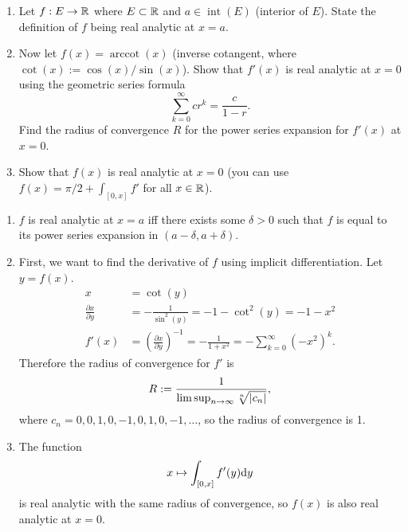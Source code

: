 \documentclass{article}
\begin{document}
\bigskip
\begin{prob}
    \begin{enumerate}[label=(\alph*)]
        \item Let $f: E \rightarrow \mathbb{R}$ where $E \subset \mathbb{R}$ and $a \in \operatorname{int}(E)$ (interior of $E$). State the definition of $f$ being real analytic at $x=a$.
        \item Now let $f(x) = \operatorname{arccot}(x)$ (inverse cotangent, where $\cot(x) := \cos(x)/\sin(x)$). Show that $f'(x)$ is real analytic at $x=0$ using the geometric series formula
            \[ \sum_{k=0}^\infty cr^k = \frac{c}{1-r}. \]
            Find the radius of convergence $R$ for the power series expansion for $f'(x)$ at $x=0$.
        \item Show that $f(x)$ is real analytic at $x=0$ (you can use $f(x) = \pi/2 + \int_{[0,x]} f'$ for all $x \in \mathbb{R}$).
    \end{enumerate}
\end{prob}
\begin{enumerate}[label=(\alph*)]
    \item $f$ is real analytic at $x=a$ iff there exists some $\delta > 0$ such that $f$ is equal to its power series expansion in $(a-\delta,a+\delta)$.
    \item First, we want to find the derivative of $f$ using implicit differentiation. Let $y=f(x)$.
        \begin{align*}
            x &= \cot(y) \\
            \frac{\partial x}{\partial y} &= -\frac{1}{\sin^2(y)} = -1 - \cot^2(y) = -1-x^2 \\
            f'(x) &= \left( \frac{\partial x}{\partial y} \right)^{-1} = - \frac{1}{1+x^2} = -\sum_{k=0}^\infty (-x^2)^k.
        \end{align*}
        Therefore the radius of convergence for $f'$ is
        \[ R := \frac{1}{\limsup_{n \rightarrow \infty} \sqrt[n]{\left\lvert c_n \right\rvert}}, \]
        where $c_n = 0, 0, 1, 0, -1, 0, 1, 0, -1, \dots$, so the radius of convergence is 1.
    \item The function
        \[ x \mapsto \int_{[0,x]} f'(y) \mathrm{d} y \]
        is real analytic with the same radius of convergence, so $f(x)$ is also real analytic at $x=0$.
\end{enumerate}
\end{document}
